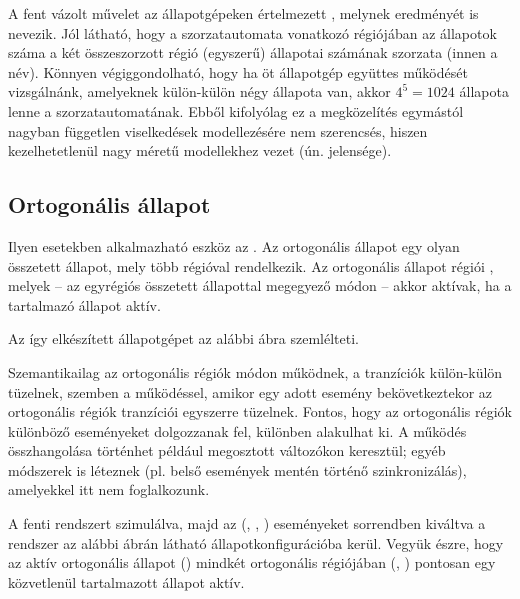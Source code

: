 A fent vázolt művelet az állapotgépeken értelmezett , melynek eredményét  is nevezik. Jól látható, hogy a szorzatautomata vonatkozó régiójában az állapotok száma a két összeszorzott régió (egyszerű) állapotai számának szorzata (innen a név). Könnyen végiggondolható, hogy ha öt állapotgép együttes működését vizsgálnánk, amelyeknek külön-külön négy állapota van, akkor $4^5=1024$ állapota lenne a szorzatautomatának. Ebből kifolyólag ez a megközelítés egymástól nagyban független viselkedések modellezésére nem szerencsés, hiszen kezelhetetlenül nagy méretű modellekhez vezet (ún.  jelensége).

\subsection{Ortogonális állapot}

Ilyen esetekben alkalmazható eszköz az . Az ortogonális állapot egy olyan összetett állapot, mely több régióval rendelkezik. Az ortogonális állapot régiói , melyek -- az egyrégiós összetett állapottal megegyező módon -- akkor aktívak, ha a tartalmazó állapot aktív.

Az így elkészített állapotgépet az alábbi ábra szemlélteti.


Szemantikailag az ortogonális régiók  módon működnek, a tranzíciók külön-külön tüzelnek, szemben a  működéssel, amikor egy adott esemény bekövetkeztekor az ortogonális régiók tranzíciói egyszerre tüzelnek. Fontos, hogy az ortogonális régiók különböző eseményeket dolgozzanak fel, különben  alakulhat ki. A működés összhangolása történhet például megosztott változókon keresztül; egyéb módszerek is léteznek (pl. belső események mentén történő szinkronizálás), amelyekkel itt nem foglalkozunk. 

\begin{megjegyzes}
	A fenti rendszert szimulálva, majd az (, , ) eseményeket sorrendben kiváltva a rendszer az alábbi ábrán látható állapotkonfigurációba kerül. Vegyük észre, hogy az aktív ortogonális állapot () mindkét ortogonális régiójában (, ) pontosan egy közvetlenül tartalmazott állapot aktív.
\end{megjegyzes}

